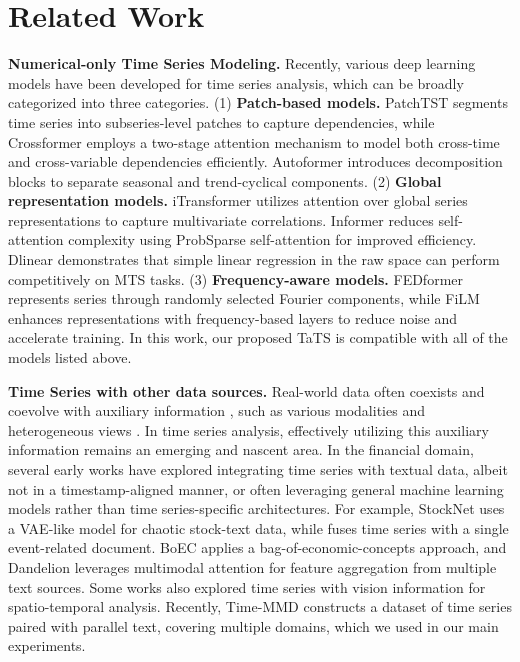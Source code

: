 \section{Related Work}

\textbf{Numerical-only Time Series Modeling.}
Recently, various deep learning models have been developed for time series analysis, which can be broadly categorized into three categories. (1) \textbf{Patch-based models.} PatchTST \cite{patchtst} segments time series into subseries-level patches to capture dependencies, while Crossformer \cite{crossformer} employs a two-stage attention mechanism to model both cross-time and cross-variable dependencies efficiently. Autoformer \cite{autoformer} introduces decomposition blocks to separate seasonal and trend-cyclical components. 
(2) \textbf{Global representation models.} iTransformer \cite{itransformer} utilizes attention over global series representations to capture multivariate correlations. Informer \cite{informer} reduces self-attention complexity using ProbSparse self-attention for improved efficiency. Dlinear \cite{dlinear} demonstrates that simple linear regression in the raw space can perform competitively on MTS tasks.
(3) \textbf{Frequency-aware models.} FEDformer \cite{fedformer} represents series through randomly selected Fourier components, while FiLM \cite{film} enhances representations with frequency-based layers to reduce noise and accelerate training. In this work, our proposed TaTS is compatible with all of the models listed above.

\textbf{Time Series with other data sources.}
Real-world data often coexists and coevolve with auxiliary information \cite{DBLP:conf/www/LiFH23, DBLP:conf/nips/BanZLQFKTH24}, such as various modalities \cite{DBLP:journals/corr/abs-2412-08174, DBLP:conf/kdd/FuFMTH22, DBLP:journals/corr/abs-2410-17576, DBLP:conf/sdm/ZhengZH23,DBLP:conf/sdm/ZhengCH19, DBLP:journals/corr/abs-2412-17336} and heterogeneous views \cite{DBLP:conf/kdd/ZhengJLTH24, DBLP:conf/kdd/ZhengXZH22, li2022novel, DBLP:conf/sigir/LiAH24}. In time series analysis, effectively utilizing this auxiliary information remains an emerging and nascent area.
In the financial domain, several early works have explored integrating time series with textual data, albeit not in a timestamp-aligned manner, or often leveraging general machine learning models rather than time series-specific architectures. For example, StockNet \cite{DBLP:conf/acl/CohenX18} uses a VAE-like model for chaotic stock-text data, while \cite{DBLP:journals/inffus/RodriguesMP19} fuses time series with a single event-related document. BoEC \cite{DBLP:conf/dsaa/FarimaniJFH21} applies a bag-of-economic-concepts approach, and Dandelion \cite{DBLP:conf/www/ZhouZZLH20} leverages multimodal attention for feature aggregation from multiple text sources. Some works also explored time series with vision information \cite{liu2012spatial, DBLP:conf/nips/GerardZS23, DBLP:journals/tgrs/LutjensLBCRMMRSPGRLN24} for spatio-temporal analysis. Recently, Time-MMD \cite{DBLP:journals/corr/abs-2406-08627} constructs a dataset of time series paired with parallel text, covering multiple domains, which we used in our main experiments.

